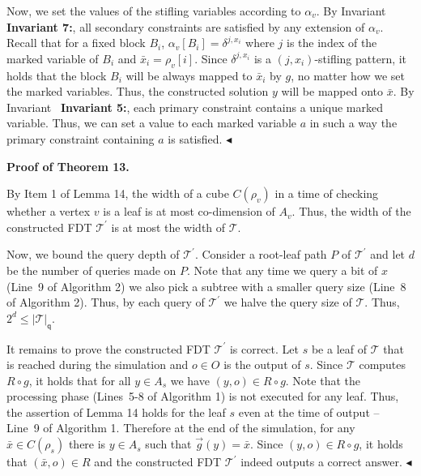 Now, we set the values of the stifling variables according to $\alpha_{v}$.
By Invariant \textbf{ Invariant 7:}, all secondary constraints are satisfied by any extension of $\alpha_{v}$.
Recall that for a fixed block $B_{i}$, $\alpha_{v}[B_{i}]=\delta^{j,x_{i}}$ where $j$ is the index of the marked variable of $B_{i}$ and $\bar{x}_{i}=\rho_{v}[i]$.
Since $\delta^{j,x_{i}}$ is a $(j,x_{i})$-stifling pattern, it holds that the block $B_{i}$ will be always mapped to $\bar{x}_{i}$ by $g$, no matter how we set the marked variables.
Thus, the constructed solution $y$ will be mapped onto $\bar{x}$.
By Invariant \textbf{ Invariant 5:}, each primary constraint contains a unique marked variable.
Thus, we can set a value to each marked variable $a$ in such a way the primary constraint containing $a$ is satisfied.
$\blacktriangleleft$\par





\par\medskip\noindent\textbf{Proof of Theorem 13.}\par




By Item 1 of Lemma 14, the width of a cube $C(\rho_{v})$ in a time of checking whether a vertex $v$ is a leaf is at most co-dimension of $A_{v}$.
Thus, the width of the constructed FDT $\mathcal{T}^{\prime}$ is at most the width of $\mathcal{T}$.\par




Now, we bound the query depth of $\mathcal{T}^{\prime}$.
Consider a root-leaf path $P$ of $\mathcal{T}^{\prime}$ and let $d$ be the number of queries made on $P$.
Note that any time we query a bit of $x$ (Line 9 of Algorithm 2) we also pick a subtree with a smaller query size (Line 8 of Algorithm 2).
Thus, by each query of $\mathcal{T}^{\prime}$ we halve the query size of $\mathcal{T}$.
Thus, $2^{d}\leq|\mathcal{T}|_{\mathsf{q}}$.\par




It remains to prove the constructed FDT $\mathcal{T}^{\prime}$ is correct.
Let $s$ be a leaf of $\mathcal{T}$ that is reached during the simulation and $o\in O$ is the output of $s$.
Since $\mathcal{T}$ computes $R\circ g$, it holds that for all $y\in A_{s}$ we have $(y,o)\in R\circ g$.
Note that the processing phase (Lines 5-8 of Algorithm 1) is not executed for any leaf.
Thus, the assertion of Lemma 14 holds for the leaf $s$ even at the time of output – Line 9 of Algorithm 1.
Therefore at the end of the simulation, for any $\bar{x}\in C(\rho_{s})$ there is $y\in A_{s}$ such that $\overrightarrow{g}(y)=\bar{x}$.
Since $(y,o)\in R\circ g$, it holds that $(\bar{x},o)\in R$ and the constructed FDT $\mathcal{T}^{\prime}$ indeed outputs a correct answer.
$\blacktriangleleft$\par








